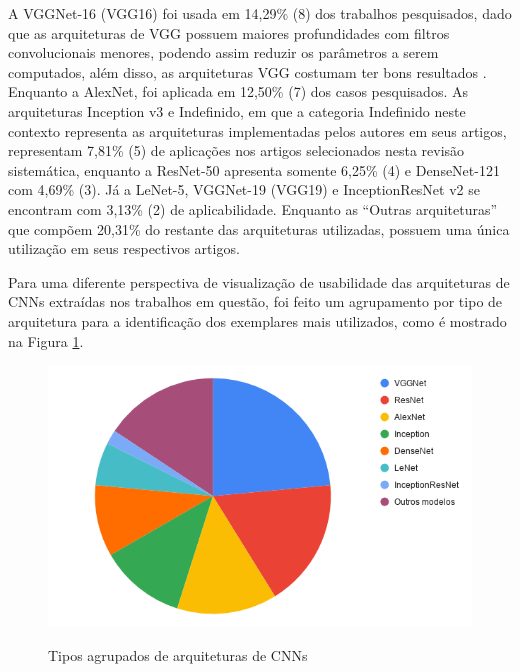 \documentclass[
	12pt,				%
	oneside,			%
	a4paper,			%
	english,			%
	brazil				%
	]{abntex2ppgsi}
\begin{document}
A VGGNet-16 (VGG16) foi usada em 14,29\% (8) dos trabalhos pesquisados, dado que as arquiteturas de VGG possuem maiores profundidades com filtros convolucionais menores, podendo assim reduzir os parâmetros a serem computados, além disso, as arquiteturas VGG costumam ter bons resultados \cite{li2020using}. Enquanto a AlexNet, foi aplicada em 12,50\% (7) dos casos pesquisados. As arquiteturas Inception v3 e Indefinido, em que a categoria Indefinido neste contexto representa as arquiteturas implementadas pelos autores em seus artigos, representam 7,81\% (5) de aplicações nos artigos selecionados nesta revisão sistemática, enquanto a ResNet-50 apresenta somente 6,25\% (4) e DenseNet-121 com 4,69\% (3). Já a LeNet-5, VGGNet-19 (VGG19) e InceptionResNet v2 se encontram com 3,13\% (2) de aplicabilidade. Enquanto as ``Outras arquiteturas'' que compõem 20,31\% do restante das arquiteturas utilizadas, possuem uma única utilização em seus respectivos artigos.

Para uma diferente perspectiva de visualização de usabilidade das arquiteturas de CNNs extraídas nos trabalhos em questão, foi feito um agrupamento por tipo de arquitetura para a identificação dos exemplares mais utilizados, como é mostrado na Figura \ref{fig:grafico_arquitetura_agrupada_vs_uso}.

\begin{figure}[H]
    \centering
    \caption{Tipos agrupados de arquiteturas de CNNs}
    \includegraphics[width=1.0\textwidth]{imagens/revisao_sistematica/grafico_arquitetura_agrupada_vs_uso.png}
    \label{fig:grafico_arquitetura_agrupada_vs_uso}
\end{figure}
\end{document}
